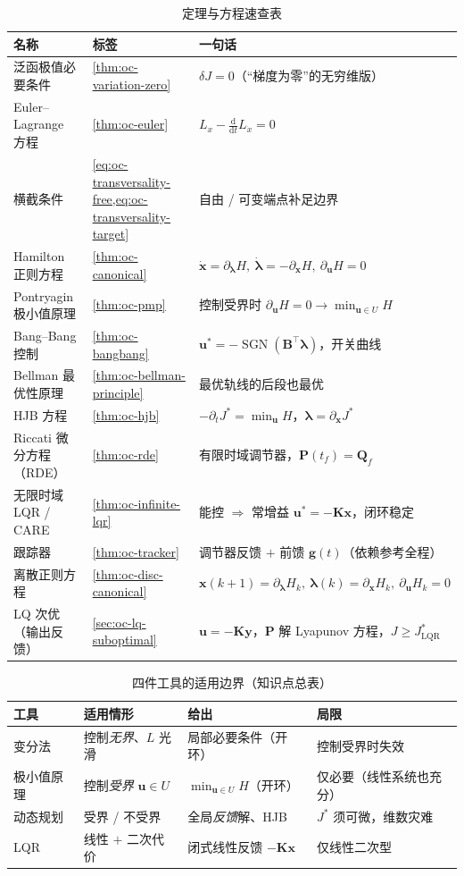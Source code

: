 \begin{table}[H]\centering\small
\caption{定理与方程速查表}
\begin{tabular}{lll}
\toprule
名称 & 标签 & 一句话 \\
\midrule
泛函极值必要条件 & \cref{thm:oc-variation-zero} & $\delta J=0$（“梯度为零”的无穷维版） \\
Euler--Lagrange 方程 & \cref{thm:oc-euler} & $L_x-\tfrac{\mathrm d}{\mathrm dt}L_{\dot x}=0$ \\
横截条件 & \cref{eq:oc-transversality-free,eq:oc-transversality-target} & 自由 / 可变端点补足边界 \\
Hamilton 正则方程 & \cref{thm:oc-canonical} & $\dot{\mathbf x}=\partial_{\boldsymbol\lambda}H,\ \dot{\boldsymbol\lambda}=-\partial_{\mathbf x}H,\ \partial_{\mathbf u}H=0$ \\
Pontryagin 极小值原理 & \cref{thm:oc-pmp} & 控制受界时 $\partial_{\mathbf u}H=0\to\min_{\mathbf u\in U}H$ \\
Bang--Bang 控制 & \cref{thm:oc-bangbang} & $\mathbf u^*=-\operatorname{SGN}(\mathbf B^\top\boldsymbol\lambda)$，开关曲线 \\
Bellman 最优性原理 & \cref{thm:oc-bellman-principle} & 最优轨线的后段也最优 \\
HJB 方程 & \cref{thm:oc-hjb} & $-\partial_t J^*=\min_{\mathbf u}H$，$\boldsymbol\lambda=\partial_{\mathbf x}J^*$ \\
Riccati 微分方程（RDE）& \cref{thm:oc-rde} & 有限时域调节器，$\mathbf P(t_f)=\mathbf Q_f$ \\
无限时域 LQR / CARE & \cref{thm:oc-infinite-lqr} & 能控 $\Rightarrow$ 常增益 $\mathbf u^*=-\mathbf K\mathbf x$，闭环稳定 \\
跟踪器 & \cref{thm:oc-tracker} & 调节器反馈 $+$ 前馈 $\mathbf g(t)$（依赖参考全程） \\
离散正则方程 & \cref{thm:oc-disc-canonical} & $\mathbf x(k{+}1)=\partial_{\boldsymbol\lambda}H_k,\ \boldsymbol\lambda(k)=\partial_{\mathbf x}H_k,\ \partial_{\mathbf u}H_k=0$ \\
LQ 次优（输出反馈）& \cref{sec:oc-lq-suboptimal} & $\mathbf u=-\mathbf K\mathbf y$，$\mathbf P$ 解 Lyapunov 方程，$J\ge J^*_{\text{LQR}}$ \\
\bottomrule
\end{tabular}
\end{table}

\begin{table}[H]\centering\small
\caption{四件工具的适用边界（知识点总表）}
\begin{tabular}{llll}
\toprule
工具 & 适用情形 & 给出 & 局限 \\
\midrule
变分法 & 控制\emph{无界}、$L$ 光滑 & 局部必要条件（开环） & 控制受界时失效 \\
极小值原理 & 控制\emph{受界} $\mathbf u\in U$ & $\min_{\mathbf u\in U}H$（开环） & 仅必要（线性系统也充分） \\
动态规划 & 受界 / 不受界 & 全局\emph{反馈}解、HJB & $J^*$ 须可微，维数灾难 \\
LQR & 线性 $+$ 二次代价 & 闭式线性反馈 $-\mathbf K\mathbf x$ & 仅线性二次型 \\
\bottomrule
\end{tabular}
\end{table}

